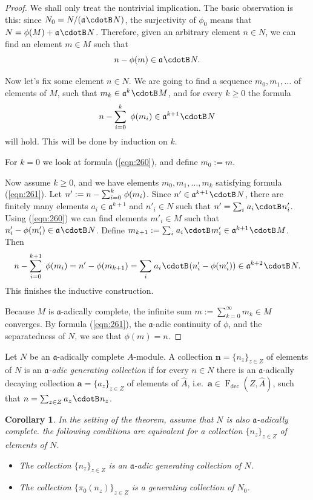 \documentclass[10pt]{amsart}
\newtheorem{cor}[equation]{Corollary}
\theoremstyle{definition}
\numberwithin{equation}{section}
\newcommand{\opn}{\operatorname}
\newcommand{\cd}{\mspace{1.3mu}{\cdotB}\mspace{1.3mu}}
\newcommand{\rmitem}[1]{\item[\textrm{(#1)}]}
\newcommand{\mfrak}[1]{\mathfrak{#1}}
\newcommand{\mrm}[1]{\mathrm{#1}}
\renewcommand{\a}{\mfrak{a}}
\newcommand{\ba}{\bsym{a}}
\newcommand{\bn}{\bsym{n}}
\newcommand{\bsym}[1]{\boldsymbol{#1}}
\newcommand{\what}[1]{\widehat{#1}}
\newcommand{\msp}[1]{\mspace{#1 mu}}
\begin{document}
\begin{proof}
We shall only treat the nontrivial implication.
The basic observation is this:
since $N_0 = N / (\a \cd N)$,
the surjectivity of $\phi_0$
means that $N = \phi(M) + \a \cd N$.
Therefore, given an arbitrary element
$n \in N$, we can find an element $m \in M$ such that
\begin{equation} \label{eqn:260}
n - \phi(m) \in \a \cd N .
\end{equation}

Now let's fix some element $n \in N$.
We are going to find a sequence
$m_0, m_1, \ldots$ of elements of $M$, such that
$m_k \in \a^{k} \cd M$, and for every $k \geq 0$ the formula
\begin{equation} \label{eqn:261}
n - \sum_{i = 0}^k \msp{5} \phi(m_i) \in \a^{k + 1} \cd N
\end{equation}
will hold. This will be done by induction on $k$.

For $k = 0$ we look at formula (\ref{eqn:260}), and define
$m_{0} := m$.

Now assume $k \geq 0$, and we have elements
$m_0, m_1, \ldots, m_k$ satisfying formula (\ref{eqn:261}).
Let $n' := n - \sum_{i = 0}^k \msp{2} \phi(m_i)$.
Since $n' \in \a^{k + 1} \cd N$, there are finitely many elements
$a_{i} \in \a^{k + 1}$ and $n'_{i} \in N$
such that
$n' = \sum_{i} \msp{2} a_i \cd n'_i$.
Using (\ref{eqn:260}) we can find elements $m'_i \in M$
such that $n'_i - \phi(m'_i) \in \a \cd N$.
Define
$m_{k + 1} := \sum_{i} \msp{2} a_i \cd m'_i \in \a^{k + 1} \cd M$.
Then
\[ n - \sum_{i = 0}^{k + 1} \msp{5} \phi(m_i) =
n' - \phi(m_{k + 1}) =
\sum_{i} \msp{2} a_i \cd (n'_i - \phi(m'_i)) \in \a^{k + 2} \cd N . \]
This finishes the inductive construction.

Because $M$ is $\a$-adically complete, the infinite sum
$m := \sum_{k = 0}^{\infty} m_k \in M$
converges. By formula (\ref{eqn:261}), the $\a$-adic continuity of $\phi$, and
the separatedness of $N$, we see that $\phi(m) = n$.
\end{proof}

Let $N$ be an $\a$-adically complete $A$-module. A collection
$\bn = \{ n_z \}_{z \in Z}$ of elements of $N$ is an
{\em $\a$-adic generating collection} if for every $n \in N$ there is an
$\a$-adically decaying collection
$\ba = \{ a_z \}_{z \in Z}$ of elements of $\what{A}$,
i.e.\ $\ba \in \opn{F}_{\mrm{dec}}(Z, \what{A})$, such that
$n = \sum_{z \in Z} a_z \cd n_z$.

\begin{cor} \label{cor:265}
In the setting of the theorem, assume that $N$ is also $\a$-adically complete.
the following conditions are equivalent for a
collection $\{ n_z \}_{z \in Z}$ of elements of $N$.
\begin{itemize}
\rmitem{i} The collection $\{ n_z \}_{z \in Z}$ is an $\a$-adic generating
collection of $N$.

\rmitem{ii} The collection $\{ \pi_0(n_z) \}_{z \in Z}$ is a
generating collection of $N_0$.
\end{itemize}
\end{cor}
\end{document}
